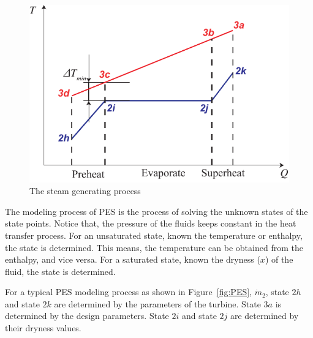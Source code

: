 \noindent \begin{figure}[htbp]
\begin{center}
	\includegraphics[width = 0.8\columnwidth]{fig/PES_TQ}
	\caption{The steam generating process}
	\label{fig:PES_TQ}
\end{center}
\end{figure}

The modeling process of PES is the process of solving the unknown states of the state points. Notice that, the pressure of the fluids keeps constant in the heat transfer process. For an unsaturated state, known the temperature or enthalpy, the state is determined. This means, the temperature can be obtained from the enthalpy, and vice versa. For a saturated state, known the dryness ($x$) of the fluid, the state is determined.

For a typical PES modeling process as shown in Figure~\ref{fig:PES}, $\dot{m}_2$, state $2h$ and state $2k$ are determined by the parameters of the turbine. State $3a$ is determined by the design parameters. State $2i$ and state $2j$ are determined by their dryness values. 

